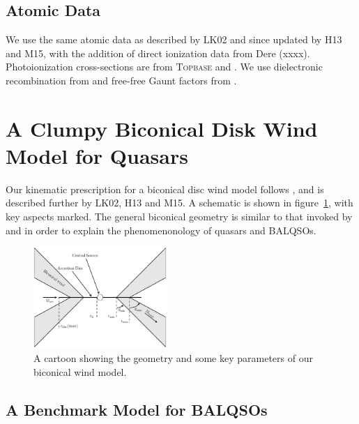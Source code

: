 \documentclass[preprint, a4paper, 11pt]{aastex}
\begin{document}
\subsection{Atomic Data}

We use the same atomic data as described by LK02 and since
updated by H13 and M15, with the addition of direct ionization data from Dere (xxxx). 
Photoionization cross-sections are from \textsc{Topbase} \citep{cunto1993} and  \cite{vfky}.
We use dielectronic recombination from \cite{badnell2006} and free-free 
Gaunt factors from \cite{sutherland1998}.






\section{A Clumpy Biconical Disk Wind Model for Quasars}

Our kinematic prescription for a biconical disc wind model
follows \cite{SV93}, and is described further by
LK02, H13 and M15. A schematic is shown in figure~\ref{fig:cartoon},
with key aspects marked. The general biconical
geometry is similar to that invoked by \cite{MCGV95} and 
\cite{elvis2000} in order to explain the phenomenonology
of quasars and BALQSOs.


\begin{figure} 
\centering
\includegraphics[width=0.45\textwidth]{figures/fig2_cartoon.eps}
\caption
{
A cartoon showing the geometry and some key parameters of
our biconical wind model.
}
\label{fig:cartoon}
\end{figure} 



\subsection{A Benchmark Model for BALQSOs}
\end{document}
